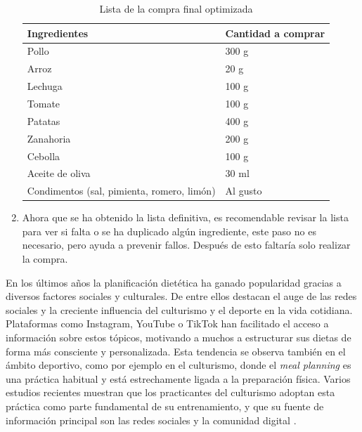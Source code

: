 \documentclass[12pt,a4paper]{report} %
\begin{document}
\begin{enumerate}
		\begin{table}[H]
			\centering			
			\label{fig:TablaIngrFinal}
			\caption{Lista de la compra final optimizada}
			\begin{tabular}{|p{5cm}|p{3cm}|}
				\hline
				\textbf{Ingredientes} & \textbf{Cantidad a comprar} \\ \hline
				Pollo & 300 g \\ \hline
				Arroz & 20 g \\ \hline
				Lechuga & 100 g \\ \hline
				Tomate & 100 g \\ \hline
				Patatas & 400 g \\ \hline
				Zanahoria & 200 g \\ \hline
				Cebolla & 100 g \\ \hline
				Aceite de oliva & 30 ml \\ \hline
				Condimentos (sal, pimienta, romero, limón) & Al gusto \\ \hline
			\end{tabular}
		\end{table}
		
		
		
		\item Ahora que se ha obtenido la lista definitiva, es recomendable revisar la lista para ver si falta o se ha duplicado algún ingrediente, este paso no es necesario, pero ayuda a prevenir fallos. Después de esto faltaría solo realizar la compra.
	\end{enumerate}
	En los últimos años la planificación dietética ha ganado popularidad gracias a diversos factores sociales y culturales. De entre ellos destacan el auge de las redes sociales y la creciente influencia del culturismo y el deporte en la vida cotidiana. Plataformas como Instagram, YouTube o TikTok han facilitado el acceso a información sobre estos tópicos, motivando a muchos a estructurar sus dietas de forma más consciente y personalizada. Esta tendencia se observa también en el ámbito deportivo, como por ejemplo en el culturismo, donde el \textit{meal planning} es una práctica habitual y está estrechamente ligada a la preparación física. Varios estudios recientes muestran que los practicantes del culturismo adoptan esta práctica como parte fundamental de su entrenamiento, y que su fuente de información principal son las redes sociales y la comunidad digital \cite{helms2019,masoga2021,benjamins2021}.
	\\	
\end{document}
